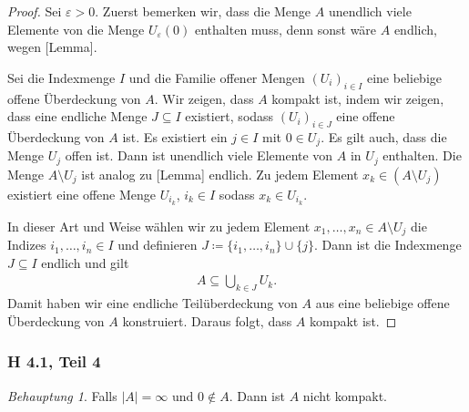 \documentclass[draft,a5paper]{article}
\theoremstyle{remark}
\newtheorem*{beh}{Behauptung}
\newcommand{\envert}[1]{\left\lvert#1\right\rvert}
\begin{document}
\begin{proof}
  Sei \(\varepsilon > 0\). Zuerst bemerken wir, dass die Menge \(A\) unendlich
  viele Elemente von die Menge \(U_{\varepsilon}(0)\) enthalten muss, denn sonst
  wäre \(A\) endlich, wegen [Lemma].

  Sei die Indexmenge \(I\) und die Familie offener Mengen
  \((U_{i})_{i \in I}\) eine beliebige offene Überdeckung von \(A\).
  Wir zeigen, dass \(A\) kompakt ist, indem wir zeigen, dass eine
  endliche Menge \(J \subseteq I\) existiert, sodass
  \((U_{i})_{i \in J}\) eine offene Überdeckung von \(A\) ist.  Es
  existiert ein \(j \in I\) mit \(0 \in U_{j}\).  Es gilt auch, dass die
  Menge \(U_{j}\) offen ist.  Dann ist unendlich viele Elemente von
  \(A\) in \(U_{j}\) enthalten.  Die Menge \(A \setminus U_{j}\) ist analog zu
  [Lemma] endlich. Zu jedem Element \(x_{k} \in (A \setminus U_{j})\) existiert
  eine offene Menge \(U_{i_{k}}\), \(i_{k} \in I\) sodass
  \(x_{k} \in U_{i_{k}}\).

  In dieser Art und Weise wählen wir zu jedem Element
  \(x_{1}, \ldots, x_{n} \in A \setminus U_{j}\) die Indizes
  \(i_{1}, \ldots, i_{n} \in I\) und definieren
  \(J \coloneq \{i_{1}, \ldots, i_{n}\} \cup \{j\}\).  Dann ist die Indexmenge
  \(J \subseteq I\) endlich und gilt
  \begin{align*}
    A \subseteq \bigcup_{k \in J}{U_{k}}.
  \end{align*}
  Damit haben wir eine endliche Teilüberdeckung von
  \(A\) aus eine beliebige offene Überdeckung von \(A\)
  konstruiert. Daraus folgt, dass \(A\) kompakt ist.
\end{proof}

\subsubsection*{H 4.1, Teil 4}

\begin{beh}
  Falls \(\envert{A} = \infty\) und \(0 \notin A\).  Dann ist \(A\) nicht kompakt.
\end{beh}
\end{document}
